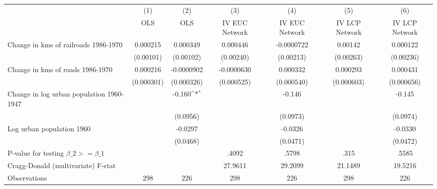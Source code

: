 {
\def\sym#1{\ifmmode^{#1}\else\(^{#1}\)\fi}
\begin{tabular}{l*{6}{c}}
\hline\hline
                &\multicolumn{1}{c}{(1)}&\multicolumn{1}{c}{(2)}&\multicolumn{1}{c}{(3)}&\multicolumn{1}{c}{(4)}&\multicolumn{1}{c}{(5)}&\multicolumn{1}{c}{(6)}\\
                &\multicolumn{1}{c}{OLS}&\multicolumn{1}{c}{OLS}&\multicolumn{1}{c}{IV EUC Network}&\multicolumn{1}{c}{IV EUC Network}&\multicolumn{1}{c}{IV LCP Network}&\multicolumn{1}{c}{IV LCP Network}\\
\hline
Change in kms of railroads 1986-1970& 0.000215         & 0.000349         & 0.000446         &-0.0000722         &  0.00142         & 0.000122         \\
                &(0.00101)         &(0.00102)         &(0.00240)         &(0.00213)         &(0.00263)         &(0.00236)         \\
[1em]
Change in kms of roads 1986-1970& 0.000216         &-0.0000902         &-0.0000630         & 0.000332         & 0.000293         & 0.000431         \\
                &(0.000301)         &(0.000326)         &(0.000525)         &(0.000540)         &(0.000603)         &(0.000656)         \\
[1em]
Change in log urban population 1960-1947&                  &   -0.160\sym{*}  &                  &   -0.146         &                  &   -0.145         \\
                &                  & (0.0956)         &                  & (0.0973)         &                  & (0.0974)         \\
[1em]
Log urban population 1960&                  &  -0.0297         &                  &  -0.0326         &                  &  -0.0330         \\
                &                  & (0.0468)         &                  & (0.0471)         &                  & (0.0472)         \\
\hline
P-value for testing $\beta\_{2} >= \beta\_{1}$&                  &                  &    .4092         &    .5798         &     .315         &    .5585         \\
Cragg-Donald (multivariate) F-stat&                  &                  &  27.9611         &  29.2099         &  21.1489         &  19.5216         \\
Observations    &      298         &      226         &      298         &      226         &      298         &      226         \\
\hline\hline
\end{tabular}
}
